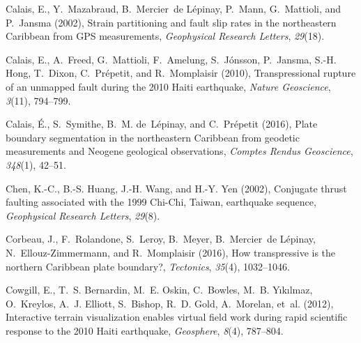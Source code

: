 \documentclass[linenumbers,draft]{agujournal}
\begin{document}
\begin{thebibliography}{65}
Calais, E., Y.~Mazabraud, B.~Mercier~de L{\'e}pinay, P.~Mann, G.~Mattioli, and
  P.~Jansma (2002), Strain partitioning and fault slip rates in the
  northeastern {Caribbean from GPS measurements}, \textit{Geophysical Research
  Letters}, \textit{29}(18).

Calais, E., A.~Freed, G.~Mattioli, F.~Amelung, S.~J{\'o}nsson, P.~Jansma, S.-H.
  Hong, T.~Dixon, C.~Pr{\'e}petit, and R.~Momplaisir (2010), Transpressional
  rupture of an unmapped fault during the 2010 {Haiti} earthquake,
  \textit{Nature Geoscience}, \textit{3}(11), 794--799.

Calais, {\'E}., S.~Symithe, B.~M. de~L{\'e}pinay, and C.~Pr{\'e}petit (2016),
  {Plate boundary segmentation in the northeastern Caribbean from geodetic
  measurements and Neogene geological observations}, \textit{Comptes Rendus
  Geoscience}, \textit{348}(1), 42--51.

Chen, K.-C., B.-S. Huang, J.-H. Wang, and H.-Y. Yen (2002), {Conjugate thrust
  faulting associated with the 1999 Chi-Chi, Taiwan, earthquake sequence},
  \textit{Geophysical Research Letters}, \textit{29}(8).

Corbeau, J., F.~Rolandone, S.~Leroy, B.~Meyer, B.~Mercier~de L{\'e}pinay,
  N.~Ellouz-Zimmermann, and R.~Momplaisir (2016), How transpressive is the
  northern {Caribbean plate boundary?}, \textit{Tectonics}, \textit{35}(4),
  1032--1046.

Cowgill, E., T.~S. Bernardin, M.~E. Oskin, C.~Bowles, M.~B. Y{\i}k{\i}lmaz,
  O.~Kreylos, A.~J. Elliott, S.~Bishop, R.~D. Gold, A.~Morelan, et~al. (2012),
  Interactive terrain visualization enables virtual field work during rapid
  scientific response to the 2010 {Haiti} earthquake, \textit{Geosphere},
  \textit{8}(4), 787--804.


\end{thebibliography}
\end{document}
